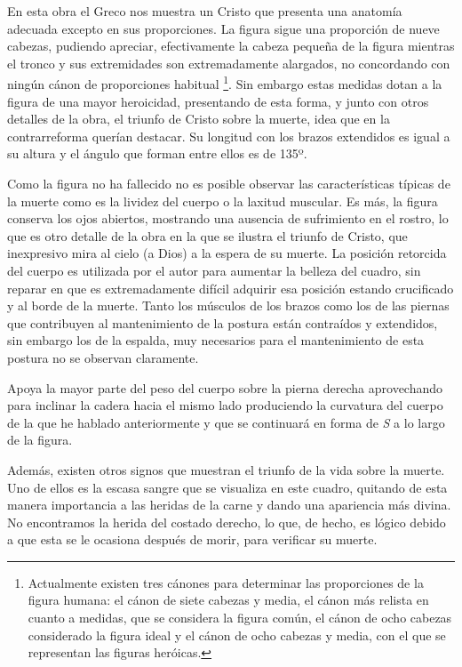 En esta obra el Greco nos muestra un Cristo que presenta una anatomía adecuada excepto en sus proporciones. La figura sigue una proporción de nueve cabezas, pudiendo apreciar, efectivamente la cabeza pequeña de la figura mientras el tronco y sus extremidades son extremadamente alargados, no concordando con ningún cánon de proporciones habitual \footnote{Actualmente existen tres cánones para determinar las proporciones de la figura humana: el cánon de siete cabezas y media, el cánon más relista en cuanto a medidas, que se considera la figura común, el cánon de ocho cabezas considerado la figura ideal y el cánon de ocho cabezas y media, con el que se representan las figuras heróicas.}. Sin embargo estas medidas dotan a la figura de una mayor heroicidad, presentando de esta forma, y junto con otros detalles de la obra, el triunfo de Cristo sobre la muerte, idea que en la contrarreforma querían destacar. Su longitud con los brazos extendidos es igual a su altura y el ángulo que forman entre ellos es de 135º.

Como la figura no ha fallecido no es posible observar las características típicas de la muerte como es la lividez del cuerpo o la laxitud muscular. Es más, la figura conserva los ojos abiertos, mostrando una ausencia de sufrimiento en el rostro, lo que es otro detalle de la obra en la que se ilustra el triunfo de Cristo, que inexpresivo mira al cielo (a Dios) a la espera de su muerte. La posición retorcida del cuerpo es utilizada por el autor para aumentar la belleza del cuadro, sin reparar en que es extremadamente difícil adquirir esa posición estando crucificado y al borde de la muerte. Tanto los músculos de los brazos como los de las piernas que contribuyen al mantenimiento de la postura están contraídos y extendidos, sin embargo los de la espalda, muy necesarios para el mantenimiento de esta postura no se observan claramente.

Apoya la mayor parte del peso del cuerpo sobre la pierna derecha aprovechando para inclinar la cadera hacia el mismo lado produciendo la curvatura del cuerpo de la que he hablado anteriormente y que se continuará en forma de \textit{S} a lo largo de la figura.

Además, existen otros signos que muestran el triunfo de la vida sobre la muerte. Uno de ellos es la escasa sangre que se visualiza en este cuadro, quitando de esta manera importancia a las heridas de la carne y dando una apariencia más divina. No encontramos la herida del costado derecho, lo que, de hecho, es lógico debido a que esta se le ocasiona después de morir, para verificar su muerte.

